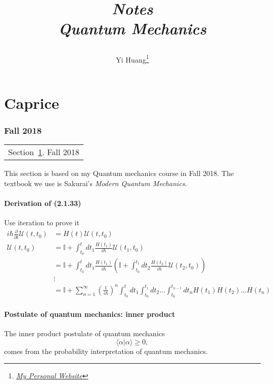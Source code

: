 \documentclass[10pt]{article}
\title{\begin{center}{\Huge \textit{Notes}}\\{{\itshape Quantum Mechanics}}\end{center}}
\author{Yi Huang\footnote{\href{https://yiihuang.com/}{\textit{My Personal Website}}}}
\affiliation{
University of Minnesota
}
\begin{document}
	\maketitle
	\flushbottom
	\newpage
	\pagestyle{fancynotes}
	\part{Caprice}
	\section{Fall 2018}\label{sec:fall2018}
	\begin{margintable}\vspace{.8in}\footnotesize
		\begin{tabularx}{\marginparwidth}{|X}
		Section~\ref{sec:fall2018}. Fall 2018\\
		\end{tabularx}
	\end{margintable}

	This section is based on my Quantum mechanics course in Fall 2018. The textbook we use is Sakurai's \textit{Modern Quantum Mechanics}.

	\subsection{Derivation of (2.1.33)}


	Use iteration to prove it
	\begin{align*}
		i \hbar \frac{\partial}{\partial t} \mathcal{U}(t,t_0) &= H(t) \mathcal{U}(t,t_0) \\
		\mathcal{U}(t,t_0)
		&= \mathbb{I} + \int_{t_0}^{t} dt_1 \frac{H(t_1)}{i\hbar} \mathcal{U}(t_1,t_0) \\
		&= \mathbb{I} + \int_{t_0}^{t} dt_1 \frac{H(t_1)}{i\hbar} \left(\mathbb{I} +\int_{t_0}^{t_1} dt_2 \frac{H(t_2)}{i\hbar} \mathcal{U}(t_2,t_0)\right) \\
		&\vdots \\
		&= \mathbb{I} + \sum_{n=1}^{\infty}\left(\frac{1}{i \hbar}\right)^n \int_{t_0}^{t} dt_1 \int_{t_0}^{t_1} dt_2 \dots \int_{t_0}^{t_{n-1}} dt_{n} H(t_1)H(t_2) \dots H(t_n)
	\end{align*}

	\subsection{Postulate of quantum mechanics: inner product}

	The inner product postulate of quantum mechanics
	\begin{equation}
		\langle\alpha| \alpha \rangle \ge 0,
	\end{equation}
	comes from the probability interpretation of quantum mechanics.
\end{document}
